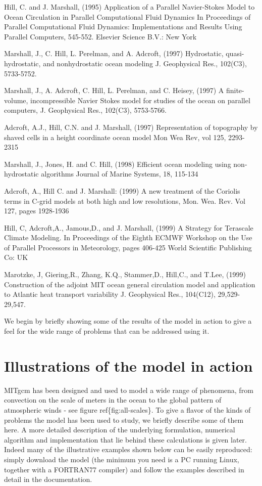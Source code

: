 \documentclass[letterpaper,10pt,english]{sphinxmanual}
\begin{document}
Hill, C. and J. Marshall, (1995)
Application of a Parallel Navier-Stokes Model to Ocean Circulation in
Parallel Computational Fluid Dynamics
In Proceedings of Parallel Computational Fluid Dynamics: Implementations
and Results Using Parallel Computers, 545-552.
Elsevier Science B.V.: New York

Marshall, J., C. Hill, L. Perelman, and A. Adcroft, (1997)
Hydrostatic, quasi-hydrostatic, and nonhydrostatic ocean modeling
J. Geophysical Res., 102(C3), 5733-5752.

Marshall, J., A. Adcroft, C. Hill, L. Perelman, and C. Heisey, (1997)
A finite-volume, incompressible Navier Stokes model for studies of the ocean
on parallel computers,
J. Geophysical Res., 102(C3), 5753-5766.

Adcroft, A.J., Hill, C.N. and J. Marshall, (1997)
Representation of topography by shaved cells in a height coordinate ocean
model
Mon Wea Rev, vol 125, 2293-2315

Marshall, J., Jones, H. and C. Hill, (1998)
Efficient ocean modeling using non-hydrostatic algorithms
Journal of Marine Systems, 18, 115-134

Adcroft, A., Hill C. and J. Marshall: (1999)
A new treatment of the Coriolis terms in C-grid models at both high and low
resolutions,
Mon. Wea. Rev. Vol 127, pages 1928-1936

Hill, C, Adcroft,A., Jamous,D., and J. Marshall, (1999)
A Strategy for Terascale Climate Modeling.
In Proceedings of the Eighth ECMWF Workshop on the Use of Parallel Processors
in Meteorology, pages 406-425
World Scientific Publishing Co: UK

Marotzke, J, Giering,R., Zhang, K.Q., Stammer,D., Hill,C., and T.Lee, (1999)
Construction of the adjoint MIT ocean general circulation model and
application to Atlantic heat transport variability
J. Geophysical Res., 104(C12), 29,529-29,547.

We begin by briefly showing some of the results of the model in action to
give a feel for the wide range of problems that can be addressed using it.


\section{Illustrations of the model in action}
\label{\detokenize{overview/overview:illustrations-of-the-model-in-action}}
MITgcm has been designed and used to model a wide range of phenomena,
from convection on the scale of meters in the ocean to the global pattern of
atmospheric winds - see figure ref\{fig:all-scales\}. To give a flavor of the
kinds of problems the model has been used to study, we briefly describe some
of them here. A more detailed description of the underlying formulation,
numerical algorithm and implementation that lie behind these calculations is
given later. Indeed many of the illustrative examples shown below can be
easily reproduced: simply download the model (the minimum you need is a PC
running Linux, together with a FORTRAN77 compiler) and follow the examples
described in detail in the documentation.
\end{document}

